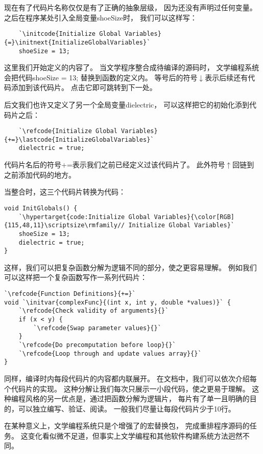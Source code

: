 现在有了代码片名称仅仅是有了正确的抽象层级，
因为还没有声明过任何变量。
之后在程序某处引入全局变量{\ttfamily shoeSize}时，
我们可以这样写：
\begin{lstlisting}
    `\initcode{Initialize Global Variables}{=}\initnext{InitializeGlobalVariables}`
    shoeSize = 13;
\end{lstlisting}

这里我们开始定义的内容了。
当文学程序整合成待编译的源码时，
文学编程系统会把代码{\ttfamily shoeSize = 13;}
替换到函数的定义内。
等号后的符号{\codecolor $\downarrow$}表示后续还有代码添加到该代码片。
点击它即可跳转到下一处。

后文我们也许又定义了另一个全局变量{\ttfamily dielectric}，
可以这样把它的初始化添到代码片之后：
\begin{lstlisting}
    `\refcode{Initialize Global Variables}{+=}\lastcode{InitializeGlobalVariables}`
    dielectric = true;
\end{lstlisting}

代码片名后的符号{\codecolor +=}表示我们之前已经定义过该代码片了。
此外符号{\codecolor $\uparrow$}回链到
之前添加代码的地方。

当整合时，这三个代码片转换为代码：
\begin{lstlisting}
void InitGlobals() {
    `\hypertarget{code:Initialize Global Variables}{\color[RGB]{115,48,11}\scriptsize\rmfamily// Initialize Global Variables}`
    shoeSize = 13;
    dielectric = true;
}
\end{lstlisting}

这样，我们可以把复杂函数分解为逻辑不同的部分，使之更容易理解。
例如我们可以这样把一个复杂函数写作一系列代码片：
\begin{lstlisting}
`\refcode{Function Definitions}{+=}`
void `\initvar{complexFunc}{(int x, int y, double *values)}` {
    `\refcode{Check validity of arguments}{}`
    if (x < y) {
        `\refcode{Swap parameter values}{}`
    }
    `\refcode{Do precomputation before loop}{}`
    `\refcode{Loop through and update values array}{}`
}
\end{lstlisting}

同样，编译时内每段代码片的内容都内联展开。
在文档中，我们可以依次介绍每个代码片的实现。
这种分解让我们每次只展示一小段代码，使之更易于理解。
这种编程风格的另一优点是，通过把函数分解为逻辑片，
每片有了单一且明确的目的，可以独立编写、验证、阅读。
一般我们尽量让每段代码片少于10行。

在某种意义上，文学编程系统只是个增强了的宏替换包，
完成重排程序源码的任务。
这变化看似微不足道，但事实上文学编程和其他软件构建系统方法迥然不同。

